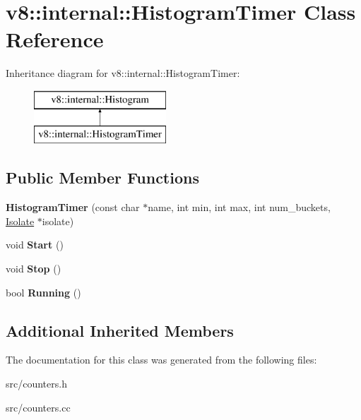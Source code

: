 \hypertarget{classv8_1_1internal_1_1_histogram_timer}{}\section{v8\+:\+:internal\+:\+:Histogram\+Timer Class Reference}
\label{classv8_1_1internal_1_1_histogram_timer}
Inheritance diagram for v8\+:\+:internal\+:\+:Histogram\+Timer\+:\begin{figure}[H]
\begin{center}
\leavevmode
\includegraphics[height=2.000000cm]{classv8_1_1internal_1_1_histogram_timer}
\end{center}
\end{figure}
\subsection*{Public Member Functions}
\begin{DoxyCompactItemize}
\item 
\hypertarget{classv8_1_1internal_1_1_histogram_timer_a25391af87ac18fcca5b2e2e943a7336e}{}{\bfseries Histogram\+Timer} (const char $\ast$name, int min, int max, int num\+\_\+buckets, \hyperlink{classv8_1_1internal_1_1_isolate}{Isolate} $\ast$isolate)\label{classv8_1_1internal_1_1_histogram_timer_a25391af87ac18fcca5b2e2e943a7336e}

\item 
\hypertarget{classv8_1_1internal_1_1_histogram_timer_ac979127ffb542e53c66dc5d700f4bd9e}{}void {\bfseries Start} ()\label{classv8_1_1internal_1_1_histogram_timer_ac979127ffb542e53c66dc5d700f4bd9e}

\item 
\hypertarget{classv8_1_1internal_1_1_histogram_timer_a890953c74235f44308230d445ebf9f1b}{}void {\bfseries Stop} ()\label{classv8_1_1internal_1_1_histogram_timer_a890953c74235f44308230d445ebf9f1b}

\item 
\hypertarget{classv8_1_1internal_1_1_histogram_timer_ae7e03caff0533d469e5abfcf4da70da2}{}bool {\bfseries Running} ()\label{classv8_1_1internal_1_1_histogram_timer_ae7e03caff0533d469e5abfcf4da70da2}

\end{DoxyCompactItemize}
\subsection*{Additional Inherited Members}


The documentation for this class was generated from the following files\+:\begin{DoxyCompactItemize}
\item 
src/counters.\+h\item 
src/counters.\+cc\end{DoxyCompactItemize}

